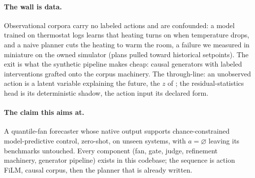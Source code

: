 \paragraph{The wall is data.}
Observational corpora carry no labeled actions and are confounded: a
model trained on thermostat logs learns that heating turns on when
temperature drops, and a naive planner cuts the heating to warm the room,
a failure we measured in miniature on the owned simulator (plans pulled
toward historical setpoints). The exit is what the synthetic pipeline
makes cheap: causal generators with labeled interventions
\citep{cauker2025} grafted onto the corpus machinery. The through-line:
an unobserved action is a latent variable explaining the future, the $z$
of \citet{lecun2022path}; the residual-statistics head is its
deterministic shadow, the action input its declared form.

\paragraph{The claim this aims at.}
A quantile-fan forecaster whose native output supports chance-constrained
model-predictive control, zero-shot, on unseen systems, with
$a=\varnothing$ leaving its benchmarks untouched. Every component (fan,
gate, judge, refinement machinery, generator pipeline) exists in this
codebase; the sequence is action FiLM, causal corpus, then the planner
that is already written.
